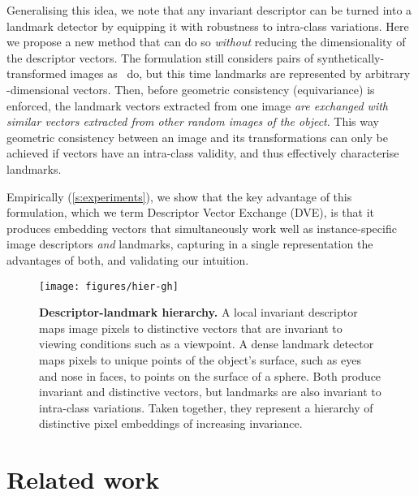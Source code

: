 \documentclass[10pt,twocolumn,letterpaper]{article}
\begin{document}
Generalising this idea, we note that any invariant descriptor can be turned into a landmark detector by equipping it with robustness to intra-class variations.
Here we propose a new method that can do so \emph{without} reducing the dimensionality of the descriptor vectors.
The formulation still considers pairs of synthetically-transformed images as~\cite{thewlis17Bunsupervised} do, but this time landmarks are represented by arbitrary -dimensional vectors.
Then, before geometric consistency (equivariance) is enforced, the landmark vectors extracted from one image \emph{are exchanged with similar vectors extracted from other random images of the object}.
This way geometric consistency between an image and its transformations can only be achieved if vectors have an intra-class validity, and thus effectively characterise landmarks.

Empirically (\cref{s:experiments}), we show that the key advantage of this formulation, which we term Descriptor Vector Exchange (DVE), is that it produces embedding vectors that simultaneously work well as instance-specific image descriptors \emph{and} landmarks, capturing in a single representation the advantages of both, and validating our intuition.

\begin{figure}[t]
\centering\texttt{[image: figures/hier-gh]}
\caption{\textbf{Descriptor-landmark hierarchy.}
A local invariant descriptor maps image pixels to distinctive vectors that are invariant to viewing conditions such as a viewpoint.
A dense landmark detector maps pixels to unique points of the object's surface, such as eyes and nose in faces, to points on the surface of a sphere.
Both produce invariant and distinctive vectors, but landmarks are also invariant to intra-class variations.
Taken together, they represent a hierarchy of distinctive pixel embeddings of increasing invariance.
}\label{f:hier}
\vspace{-0.3cm}
\end{figure}  \section{Related work}\label{s:related}
\end{document}

